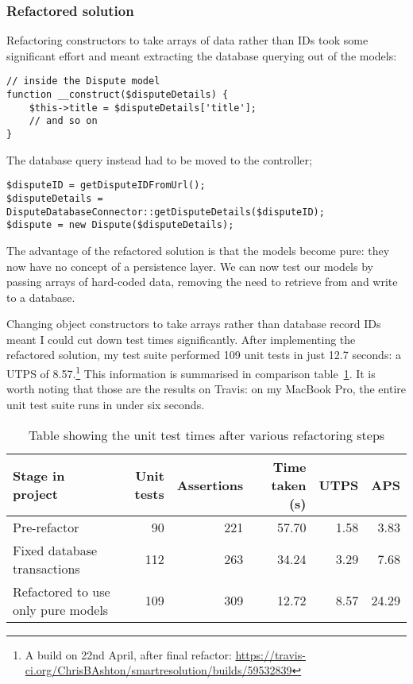 \subsubsection{Refactored solution}

Refactoring constructors to take arrays of data rather than IDs took some significant effort and meant extracting the database querying out of the models:

\begin{lstlisting}
// inside the Dispute model
function __construct($disputeDetails) {
    $this->title = $disputeDetails['title'];
    // and so on
}
\end{lstlisting}

The database query instead had to be moved to the controller;

\begin{lstlisting}
$disputeID = getDisputeIDFromUrl();
$disputeDetails = DisputeDatabaseConnector::getDisputeDetails($disputeID);
$dispute = new Dispute($disputeDetails);
\end{lstlisting}

The advantage of the refactored solution is that the models become pure: they now have no concept of a persistence layer. We can now test our models by passing arrays of hard-coded data, removing the need to retrieve from and write to a database.

Changing object constructors to take arrays rather than database record IDs meant I could cut down test times significantly. After implementing the refactored solution, my test suite performed 109 unit tests in just 12.7 seconds: a UTPS of 8.57.\footnote{A build on 22nd April, after final refactor: \url{https://travis-ci.org/ChrisBAshton/smartresolution/builds/59532839}} This information is summarised in comparison table~\ref{table:testTimes}. It is worth noting that those are the results on Travis: on my MacBook Pro, the entire unit test suite runs in under six seconds.

\begin{table}[h!]
\label{table:testTimes} 
\begin{center}
\begin{tabular}{ l | r | r | r | r | r}
  Stage in project & Unit tests & Assertions & Time taken (s) & UTPS & APS \\
  \hline
  Pre-refactor & 90 & 221 & 57.70 & 1.58 & 3.83\\
  Fixed database transactions & 112 & 263 & 34.24 & 3.29 & 7.68\\
  Refactored to use only pure models & 109 & 309 & 12.72 & 8.57 & 24.29
\end{tabular}
\end{center}
\caption {Table showing the unit test times after various refactoring steps}
\end{table}

